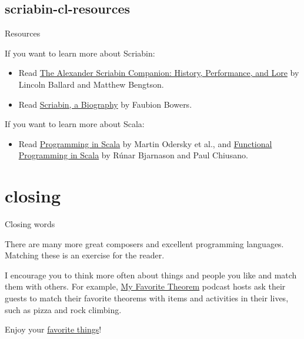 \documentclass{article}
\begin{document}
\subsection{scriabin-cl-resources}{Resources}

If you want to learn more about Scriabin:
\begin{itemize}
  \item
  Read \href{https://www.amazon.com/Alexander-Scriabin-Companion-History-Performance/dp/1442232617/}{The Alexander Scriabin Companion: History, Performance, and Lore} by Lincoln Ballard and Matthew Bengtson.
  \item
  Read \href{https://www.amazon.com/Scriabin-Biography-Second-Revised-Dover/dp/0486288978/}{Scriabin, a Biography} by Faubion Bowers.
\end{itemize}

If you want to learn more about Scala:
\begin{itemize}
    \item
    Read \href{https://www.amazon.com/Programming-Scala-Fifth-Odersky-dp-0997148004/dp/0997148004/}{Programming in Scala} by Martin Odersky et al., and \href{https://www.amazon.com/gp/product/1617290653/}{Functional Programming in Scala} by Rúnar Bjarnason and Paul Chiusano.
\end{itemize}

\section{closing}{Closing words}

There are many more great composers and excellent programming languages.
Matching these is an exercise for the reader.

I encourage you to think more often about things and people you like and match them with others.
For example, \href{https://kpknudson.com/my-favorite-theorem/}{My Favorite Theorem} podcast hosts ask their guests to match their favorite theorems with items and activities in their lives, such as pizza and rock climbing.

Enjoy your \href{https://www.youtube.com/watch?v=2G6dd7ikrXs}{favorite things}!
\end{document}
